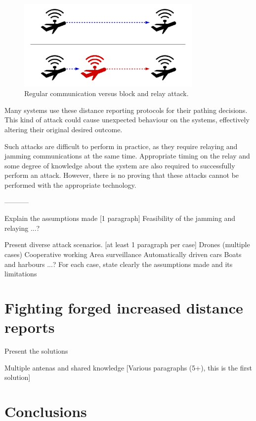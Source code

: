 \documentclass{article}
\begin{document}
\begin{figure}[h!]
  \centering
    \includegraphics[width=0.8\textwidth]{images/attack1.png}
  \caption{Regular communication versus block and relay attack.}
  \label{fig:attackexample1}
\end{figure}

Many systems use these distance reporting protocols for their pathing decisions. This kind of attack could cause unexpected behaviour on the systems, effectively altering their original desired outcome. 

Such attacks are difficult to perform in practice, as they require relaying and jamming communications at the same time. Appropriate timing on the relay and some degree of knowledge about the system are also required to successfully perform an attack. However, there is no proving that these attacks cannot be performed with the appropriate technology.


-----------


Explain the assumptions made [1 paragraph]
   Feasibility of the jamming and relaying
   ...?
   
Present diverse attack scenarios. [at least 1 paragraph per case]
   Drones (multiple cases)
     Cooperative working
     Area surveillance
   Automatically driven cars
   Boats and harbours
  ...?
For each case, state clearly the assumptions made and its limitations


\section{Fighting forged increased distance reports}

Present the solutions

Multiple antenas and shared knowledge [Various paragraphs (5+), this is the first solution]

\section{Conclusions}
\end{document}
